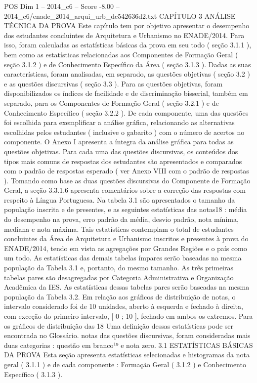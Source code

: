 \begin{textsample}{POS Dim 1 – 2014\_c6 – Score -8.00 – 2014\_c6/enade\_2014\_arqui\_urb\_dc542636d2.txt}  \label{ex:f1_pos_428}
CAPÍTULO 3 ANÁLISE TÉCNICA DA PROVA Este capítulo tem por objetivo apresentar o desempenho dos estudantes concluintes de Arquitetura e Urbanismo no ENADE/2014.
Para isso, foram calculadas as estatísticas básicas da prova em seu todo ( seção 3.1.1 ), bem como as estatísticas relacionadas aos Componentes de Formação Geral ( seção 3.1.2 ) e de Conhecimento Específico da Área ( seção 3.1.3 ).
Dadas as suas características, foram analisadas, em separado, as questões objetivas ( seção 3.2 ) e as questões discursivas ( seção 3.3 ).
Para as questões objetivas, foram disponibilizados os índices de facilidade e de discriminação bisserial, também em separado, para os Componentes de Formação Geral ( seção 3.2.1 ) e de Conhecimento Específico ( seção 3.2.2 ).
De cada componente, uma das questões foi escolhida para exemplificar a análise gráfica, relacionando as alternativas escolhidas pelos estudantes ( inclusive o gabarito ) com o número de acertos no componente.
O Anexo I apresenta a íntegra da análise gráfica para todas as questões objetivas.
Para cada uma das questões discursivas, os conteúdos dos tipos mais comuns de respostas dos estudantes são apresentados e comparados com o padrão de respostas esperado ( ver Anexo VIII com o padrão de respostas ).
Tomando como base as duas questões discursivas do Componente de Formação Geral, a seção 3.3.1.6 apresenta comentários sobre a correção das respostas com respeito à Língua Portuguesa.
Na tabela 3.1 são apresentados o tamanho da população inscrita e de presentes, e as seguintes estatísticas das notas18 : média do desempenho na prova, erro padrão da média, desvio padrão, nota mínima, mediana e nota máxima.
Tais estatísticas contemplam o total de estudantes concluintes da Área de Arquitetura e Urbanismo inscritos e presentes à prova do ENADE/2014, tendo em vista as agregações por Grandes Regiões e o país como um todo.
As estatísticas das demais tabelas ímpares serão baseadas na mesma população da Tabela 3.1 e, portanto, do mesmo tamanho.
As três primeiras tabelas pares são desagregadas por Categoria Administrativa e Organização Acadêmica da IES.
As estatísticas dessas tabelas pares serão baseadas na mesma população da Tabela 3.2.
Em relação aos gráficos de distribuição de notas, o intervalo considerado foi de 10 unidades, aberto à esquerda e fechado à direita, com exceção do primeiro intervalo, [ 0 ; 10 ], fechado em ambos os extremos.
Para os gráficos de distribuição das 18 Uma definição dessas estatísticas pode ser encontrada no Glossário. notas das questões discursivas, foram consideradas mais duas categorias : questão em branco¹⁹ e nota zero. 3.1 ESTATÍSTICAS BÁSICAS DA PROVA Esta seção apresenta estatísticas selecionadas e histogramas da nota geral ( 3.1.1 ) e de cada componente : Formação Geral ( 3.1.2 ) e Conhecimento Específico ( 3.1.3 ).

\end{textsample}

